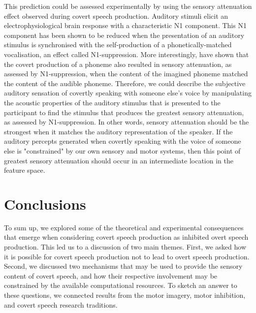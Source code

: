 \documentclass[utf8]{template/frontiersSCNS} %
\begin{document}
This prediction could be assessed experimentally by using the sensory attenuation effect observed during covert speech production. Auditory stimuli elicit an electrophysiological brain response with a characteristic N1 component. This N1 component has been shown to be reduced when the presentation of an auditory stimulus is synchronised with the self-production of a phonetically-matched vocalisation, an effect called N1-suppression. More interestingly, \cite{whitford_neurophysiological_2017} have shown that the covert production of a phoneme also resulted in sensory attenuation, as assessed by N1-suppression, when the content of the imagined phoneme matched the content of the audible phoneme. Therefore, we could describe the subjective auditory sensation of covertly speaking with someone else’s voice by manipulating the acoustic properties of the auditory stimulus that is presented to the participant to find the stimulus that produces the greatest sensory attenuation, as assessed by N1-suppression. In other words, sensory attenuation should be the strongest when it matches the auditory representation of the speaker. If the auditory percepts generated when covertly speaking with the voice of someone else is "constrained" by our own sensory and motor systems, then this point of greatest sensory attenuation should occur in an intermediate location in the feature space.

\section{Conclusions}


To sum up, we explored some of the theoretical and experimental consequences that emerge when considering covert speech production as inhibited overt speech production. This led us to a discussion of two main themes. First, we asked how it is possible for covert speech production not to lead to overt speech production. Second, we discussed two mechanisms that may be used to provide the sensory content of covert speech, and how their respective involvement may be constrained by the available computational resources. To sketch an answer to these questions, we connected results from the motor imagery, motor inhibition, and covert speech research traditions.
\end{document}
